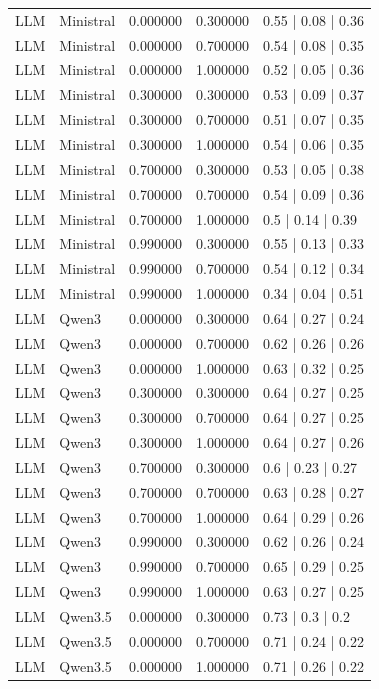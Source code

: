 \begin{longtable}{lllll}
LLM & Ministral & 0.000000 & 0.300000 & 0.55 | 0.08 | 0.36 \\
LLM & Ministral & 0.000000 & 0.700000 & 0.54 | 0.08 | 0.35 \\
LLM & Ministral & 0.000000 & 1.000000 & 0.52 | 0.05 | 0.36 \\
LLM & Ministral & 0.300000 & 0.300000 & 0.53 | 0.09 | 0.37 \\
LLM & Ministral & 0.300000 & 0.700000 & 0.51 | 0.07 | 0.35 \\
LLM & Ministral & 0.300000 & 1.000000 & 0.54 | 0.06 | 0.35 \\
LLM & Ministral & 0.700000 & 0.300000 & 0.53 | 0.05 | 0.38 \\
LLM & Ministral & 0.700000 & 0.700000 & 0.54 | 0.09 | 0.36 \\
LLM & Ministral & 0.700000 & 1.000000 & 0.5 | 0.14 | 0.39 \\
LLM & Ministral & 0.990000 & 0.300000 & 0.55 | 0.13 | 0.33 \\
LLM & Ministral & 0.990000 & 0.700000 & 0.54 | 0.12 | 0.34 \\
LLM & Ministral & 0.990000 & 1.000000 & 0.34 | 0.04 | 0.51 \\
LLM & Qwen3 & 0.000000 & 0.300000 & 0.64 | 0.27 | 0.24 \\
LLM & Qwen3 & 0.000000 & 0.700000 & 0.62 | 0.26 | 0.26 \\
LLM & Qwen3 & 0.000000 & 1.000000 & 0.63 | 0.32 | 0.25 \\
LLM & Qwen3 & 0.300000 & 0.300000 & 0.64 | 0.27 | 0.25 \\
LLM & Qwen3 & 0.300000 & 0.700000 & 0.64 | 0.27 | 0.25 \\
LLM & Qwen3 & 0.300000 & 1.000000 & 0.64 | 0.27 | 0.26 \\
LLM & Qwen3 & 0.700000 & 0.300000 & 0.6 | 0.23 | 0.27 \\
LLM & Qwen3 & 0.700000 & 0.700000 & 0.63 | 0.28 | 0.27 \\
LLM & Qwen3 & 0.700000 & 1.000000 & 0.64 | 0.29 | 0.26 \\
LLM & Qwen3 & 0.990000 & 0.300000 & 0.62 | 0.26 | 0.24 \\
LLM & Qwen3 & 0.990000 & 0.700000 & 0.65 | 0.29 | 0.25 \\
LLM & Qwen3 & 0.990000 & 1.000000 & 0.63 | 0.27 | 0.25 \\
LLM & Qwen3.5 & 0.000000 & 0.300000 & 0.73 | 0.3 | 0.2 \\
LLM & Qwen3.5 & 0.000000 & 0.700000 & 0.71 | 0.24 | 0.22 \\
LLM & Qwen3.5 & 0.000000 & 1.000000 & 0.71 | 0.26 | 0.22 \\

\end{longtable}

